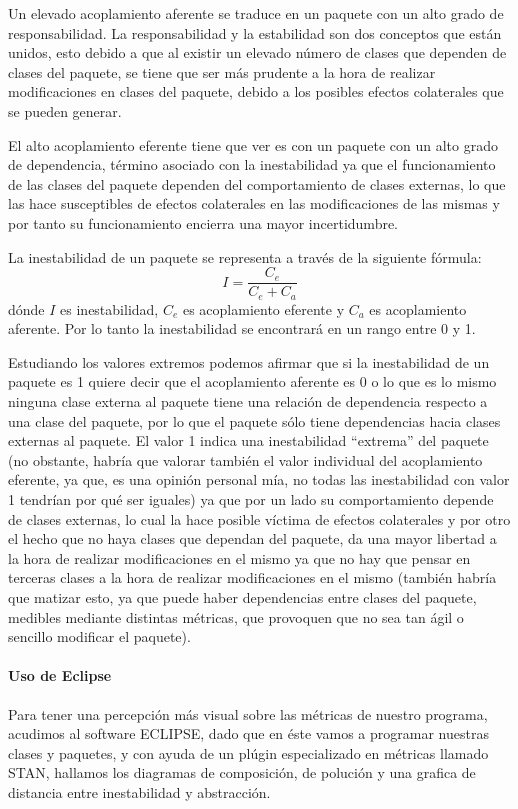 Un elevado acoplamiento aferente se traduce en un paquete con un alto grado de responsabilidad. La responsabilidad y la estabilidad son dos conceptos que están unidos, esto debido a que al existir un elevado número de clases que dependen de clases del paquete, se tiene que ser más prudente a la hora de realizar modificaciones en clases del paquete, debido a los posibles efectos colaterales que se pueden generar.

El alto acoplamiento eferente tiene que ver es con un paquete con un alto grado de dependencia, término asociado con la inestabilidad ya que el funcionamiento de las clases del paquete dependen del comportamiento de clases externas, lo que las hace susceptibles de efectos colaterales en las modificaciones de las mismas y por tanto su funcionamiento encierra una mayor incertidumbre.

La inestabilidad de un paquete se representa a través de la siguiente fórmula:$$I=\frac{C_e}{C_e+C_a}$$ dónde $I$ es inestabilidad, $C_e$ es acoplamiento eferente y $C_a$ es acoplamiento aferente. Por lo tanto la inestabilidad se encontrará en un rango entre 0 y 1.

Estudiando los valores extremos podemos afirmar que si la inestabilidad de un paquete es 1 quiere decir que el acoplamiento aferente es 0 o lo que es lo mismo ninguna clase externa al paquete tiene una relación de dependencia respecto a una clase del paquete, por lo que el paquete sólo tiene dependencias hacia clases externas al paquete. El valor 1 indica una inestabilidad “extrema” del paquete (no obstante, habría que valorar también el valor individual del acoplamiento eferente, ya que, es una opinión personal mía, no todas las inestabilidad con valor 1 tendrían por qué ser iguales) ya que por un lado su comportamiento depende de clases externas, lo cual la hace posible víctima de efectos colaterales y por otro el hecho que no haya clases que dependan del paquete, da una mayor libertad a la hora de realizar modificaciones en el mismo ya que no hay que pensar en terceras clases a la hora de realizar modificaciones en el mismo (también habría que matizar esto, ya que puede haber dependencias entre clases del paquete, medibles mediante distintas métricas, que provoquen que no sea tan ágil o sencillo modificar el paquete)\cite{Pw8M}.

\paragraph{Uso de Eclipse}
Para tener una percepción más visual sobre las métricas de nuestro programa, acudimos al software ECLIPSE, dado que en éste vamos a programar nuestras clases y paquetes, y con ayuda de un plúgin especializado en métricas llamado STAN, hallamos los diagramas de composición, de polución y una grafica de distancia entre inestabilidad y abstracción.


